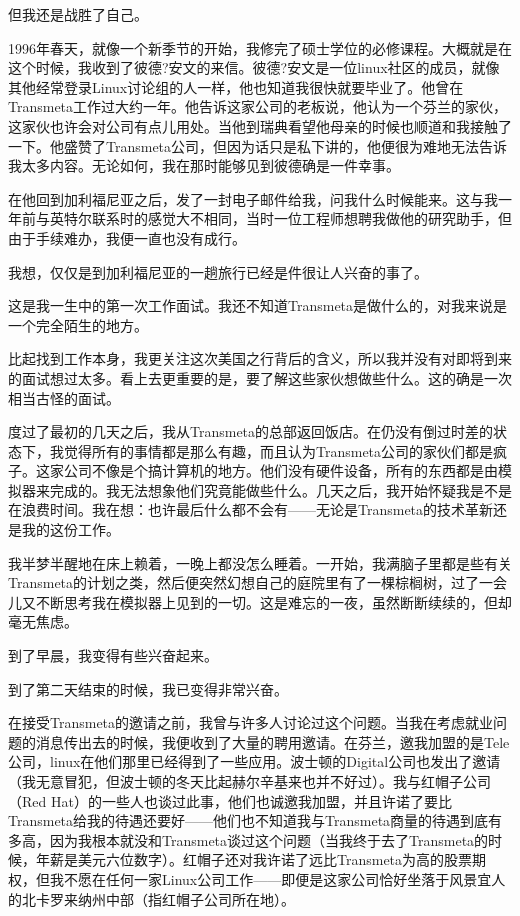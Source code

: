 但我还是战胜了自己。

1996年春天，就像一个新季节的开始，我修完了硕士学位的必修课程。大概就是在这个时候，我收到了彼德?安文的来信。彼德?安文是一位linux社区的成员，就像其他经常登录Linux讨论组的人一样，他也知道我很快就要毕业了。他曾在Transmeta工作过大约一年。他告诉这家公司的老板说，他认为一个芬兰的家伙，这家伙也许会对公司有点儿用处。当他到瑞典看望他母亲的时候也顺道和我接触了一下。他盛赞了Transmeta公司，但因为话只是私下讲的，他便很为难地无法告诉我太多内容。无论如何，我在那时能够见到彼德确是一件幸事。

在他回到加利福尼亚之后，发了一封电子邮件给我，问我什么时候能来。这与我一年前与英特尔联系时的感觉大不相同，当时一位工程师想聘我做他的研究助手，但由于手续难办，我便一直也没有成行。

我想，仅仅是到加利福尼亚的一趟旅行已经是件很让人兴奋的事了。

这是我一生中的第一次工作面试。我还不知道Transmeta是做什么的，对我来说是一个完全陌生的地方。

比起找到工作本身，我更关注这次美国之行背后的含义，所以我并没有对即将到来的面试想过太多。看上去更重要的是，要了解这些家伙想做些什么。这的确是一次相当古怪的面试。

度过了最初的几天之后，我从Transmeta的总部返回饭店。在仍没有倒过时差的状态下，我觉得所有的事情都是那么有趣，而且认为Transmeta公司的家伙们都是疯子。这家公司不像是个搞计算机的地方。他们没有硬件设备，所有的东西都是由模拟器来完成的。我无法想象他们究竟能做些什么。几天之后，我开始怀疑我是不是在浪费时间。我在想：也许最后什么都不会有——无论是Transmeta的技术革新还是我的这份工作。

我半梦半醒地在床上赖着，一晚上都没怎么睡着。一开始，我满脑子里都是些有关Transmeta的计划之类，然后便突然幻想自己的庭院里有了一棵棕榈树，过了一会儿又不断思考我在模拟器上见到的一切。这是难忘的一夜，虽然断断续续的，但却毫无焦虑。

到了早晨，我变得有些兴奋起来。

到了第二天结束的时候，我已变得非常兴奋。

在接受Transmeta的邀请之前，我曾与许多人讨论过这个问题。当我在考虑就业问题的消息传出去的时候，我便收到了大量的聘用邀请。在芬兰，邀我加盟的是Tele公司，linux在他们那里已经得到了一些应用。波士顿的Digital公司也发出了邀请（我无意冒犯，但波士顿的冬天比起赫尔辛基来也并不好过）。我与红帽子公司（Red Hat）的一些人也谈过此事，他们也诚邀我加盟，并且许诺了要比Transmeta给我的待遇还要好——他们也不知道我与Transmeta商量的待遇到底有多高，因为我根本就没和Transmeta谈过这个问题（当我终于去了Transmeta的时候，年薪是美元六位数字）。红帽子还对我许诺了远比Transmeta为高的股票期权，但我不愿在任何一家Linux公司工作——即便是这家公司恰好坐落于风景宜人的北卡罗来纳州中部（指红帽子公司所在地）。

